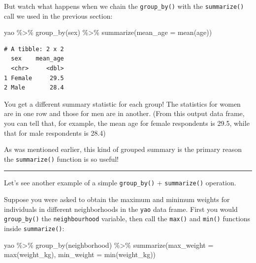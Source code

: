 \documentclass[
  letterpaper,
  DIV=11,
  numbers=noendperiod]{scrreprt}
\newenvironment{Shaded}{\begin{snugshade}}{\end{snugshade}}
\newcommand{\AttributeTok}[1]{\textcolor[rgb]{0.40,0.45,0.13}{#1}}
\newcommand{\FunctionTok}[1]{\textcolor[rgb]{0.28,0.35,0.67}{#1}}
\newcommand{\NormalTok}[1]{\textcolor[rgb]{0.00,0.23,0.31}{#1}}
\newcommand{\SpecialCharTok}[1]{\textcolor[rgb]{0.37,0.37,0.37}{#1}}
\begin{document}
But watch what happens when we chain the \texttt{group\_by()} with the
\texttt{summarize()} call we used in the previous section:

\begin{Shaded}
\begin{Highlighting}[]
\NormalTok{yao }\SpecialCharTok{\%\textgreater{}\%} 
  \FunctionTok{group\_by}\NormalTok{(sex) }\SpecialCharTok{\%\textgreater{}\%} 
  \FunctionTok{summarize}\NormalTok{(}\AttributeTok{mean\_age =} \FunctionTok{mean}\NormalTok{(age))}
\end{Highlighting}
\end{Shaded}

\begin{verbatim}
# A tibble: 2 x 2
  sex    mean_age
  <chr>     <dbl>
1 Female     29.5
2 Male       28.4
\end{verbatim}

You get a different summary statistic for each group! The statistics for
women are in one row and those for men are in another. (From this output
data frame, you can tell that, for example, the mean age for female
respondents is 29.5, while that for male respondents is 28.4)

As was mentioned earlier, this kind of grouped summary is the primary
reason the \texttt{summarize()} function is so useful!

\begin{center}\rule{0.5\linewidth}{0.5pt}\end{center}

Let's see another example of a simple \texttt{group\_by()} +
\texttt{summarize()} operation.

Suppose you were asked to obtain the maximum and minimum weights for
individuals in different neighborhoods in the \texttt{yao} data frame.
First you would \texttt{group\_by()} the \texttt{neighbourhood}
variable, then call the \texttt{max()} and \texttt{min()} functions
inside \texttt{summarize()}:

\begin{Shaded}
\begin{Highlighting}[]
\NormalTok{yao }\SpecialCharTok{\%\textgreater{}\%} 
  \FunctionTok{group\_by}\NormalTok{(neighborhood) }\SpecialCharTok{\%\textgreater{}\%} 
  \FunctionTok{summarize}\NormalTok{(}\AttributeTok{max\_weight =} \FunctionTok{max}\NormalTok{(weight\_kg), }
            \AttributeTok{min\_weight =} \FunctionTok{min}\NormalTok{(weight\_kg))}
\end{Highlighting}
\end{Shaded}
\end{document}
